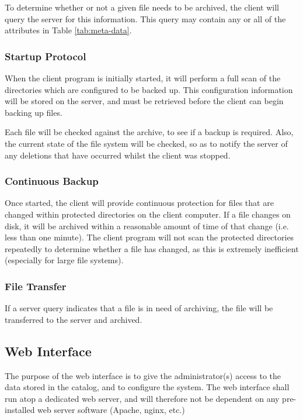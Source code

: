 To determine whether or not a given file needs to be archived, the client will
query the server for this information. This query may contain any or all of the
attributes in Table \ref{tab:meta-data}.

\subsubsection{Startup Protocol}

When the client program is initially started, it will perform a full scan of
the directories which are configured to be backed up. This configuration
information will be stored on the server, and must be retrieved before the
client can begin backing up files.

Each file will be checked against the archive, to see if a backup is required.
Also, the current state of the file system will be checked, so as to notify the
server of any deletions that have occurred whilst the client was stopped.

\subsubsection{Continuous Backup}

Once started, the client will provide continuous protection for files that are
changed within protected directories on the client computer. If a file changes
on disk, it will be archived within a reasonable amount of time of that change
(i.e. less than one minute). The client program will not scan the protected
directories repeatedly to determine whether a file has changed, as this is
extremely inefficient (especially for large file systems).

\subsubsection{File Transfer}

If a server query indicates that a file is in need of archiving, the file will
be transferred to the server and archived.

\subsection{Web Interface}

The purpose of the web interface is to give the administrator(s) access to the
data stored in the catalog, and to configure the system. The web interface
shall run atop a dedicated web server, and will therefore not be dependent on
any pre-installed web server software (Apache, nginx, etc.)

